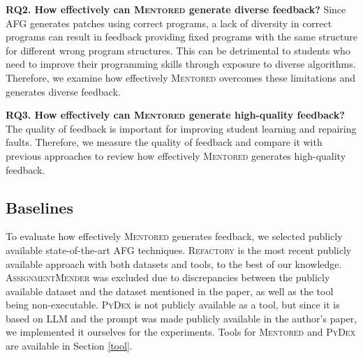 \documentclass[10pt,conference]{IEEEtran}
\begin{document}
        \textbf{RQ2. How effectively can \textsc{Mentored} generate diverse feedback?}
        Since AFG generates patches using correct programs, a lack of diversity in correct programs can result in feedback providing fixed programs with the same structure for different wrong program structures. This can be detrimental to students who need to improve their programming skills through exposure to diverse algorithms. Therefore, we examine how effectively \textsc{Mentored} overcomes these limitations and generates diverse feedback.


        \textbf{RQ3. How effectively can \textsc{Mentored} generate high-quality feedback?}
        The quality of feedback is important for improving student learning and repairing faults. Therefore, we measure the quality of feedback and compare it with previous approaches to review how effectively \textsc{Mentored} generates high-quality feedback.


    \subsection{Baselines}
        To evaluate how effectively \textsc{Mentored} generates feedback, we selected publicly available state-of-the-art AFG techniques. \textsc{Refactory} \cite{hu2019re} is the most recent publicly available approach with both datasets and tools, to the best of our knowledge. \textsc{AssignmentMender} \cite{li2022generating} was excluded due to discrepancies between the publicly available dataset and the dataset mentioned in the paper, as well as the tool being non-executable. \textsc{PyDex} \cite{zhang2024pydex} is not publicly available as a tool, but since it is based on LLM and the prompt was made publicly available in the author's paper, we implemented it ourselves for the experiments. Tools for \textsc{Mentored} and \textsc{PyDex} are available in Section \ref{tool}.
\end{document}
